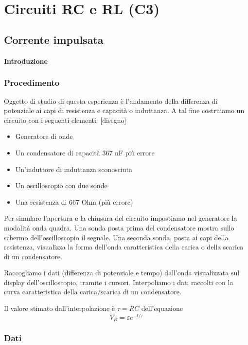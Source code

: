 \chapter{Circuiti RC e RL (C3)}

\section{Corrente impulsata}
\subsubsection{Introduzione}

\subsection{Procedimento}

Oggetto di studio di questa esperienza è l'andamento della differenza di potenziale ai capi di resistenza e capacità o induttanza.
A tal fine costruiamo un circuito con i seguenti elementi:
[disegno]

\begin{itemize}
  \item Generatore di onde
  \item Un condensatore di capacità 367 nF più errore
  \item Un'induttore di induttanza sconosciuta
  \item Un oscilloscopio con due sonde
  \item Una resistenza di 667 Ohm (più errore)
\end{itemize}

Per simulare l'apertura e la chiusura del circuito impostiamo nel generatore la modalità onda quadra. Una sonda posta prima del condensatore mostra sullo schermo dell'oscilloscopio il segnale.  
Una seconda sonda, posta ai capi della resistenza, visualizza la forma dell'onda caratteristica della carica o della scarica di un condensatore.

Raccogliamo i dati (differenza di potenziale e tempo) dall'onda visualizzata sul display dell'oscilloscopio, tramite i cursori. Interpoliamo i dati raccolti con la curva caratteristica della carica/scarica di un condensatore.

Il valore stimato dall'interpolazione è $\tau=RC$ dell'equazione
$$V_R = \varepsilon e^{-t/\tau}$$

\subsection{Dati}
